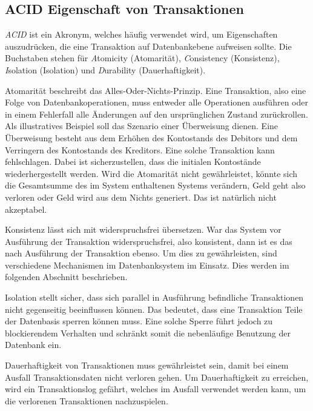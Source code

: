 \subsection{ACID Eigenschaft von Transaktionen}
\textit{ACID} ist ein Akronym, welches häufig verwendet wird, um Eigenschaften auszudrücken, die eine Transaktion auf Datenbankebene aufweisen sollte. Die Buchstaben stehen für \textit{A}tomicity (Atomarität), \textit{C}onsistency (Konsistenz), \textit{I}solation (Isolation) und \textit{D}urability (Dauerhaftigkeit). 

\par Atomarität beschreibt das Alles-Oder-Nichts-Prinzip. Eine Transaktion, also eine Folge von Datenbankoperationen, muss entweder alle Operationen ausführen oder in einem Fehlerfall alle Änderungen auf den ursprünglichen Zustand zurückrollen. Als illustratives Beispiel soll das Szenario einer Überweisung dienen. Eine Überweisung besteht aus dem Erhöhen des Kontostands des Debitors und dem Verringern des Kontostands des Kreditors. Eine solche Transaktion kann fehlschlagen. Dabei ist sicherzustellen, dass die initialen Kontostände wiederhergestellt werden. Wird die Atomarität nicht gewährleistet, könnte sich die Gesamtsumme des im System enthaltenen Systems verändern, Geld geht also verloren oder Geld wird aus dem Nichts generiert. Das ist natürlich nicht akzeptabel. 

\par Konsistenz lässt sich mit widerspruchsfrei übersetzen. War das System vor Ausführung der Transaktion widerspruchsfrei, also konsistent, dann ist es das nach Ausführung der Transaktion ebenso. Um dies zu gewährleisten, sind verschiedene Mechanismen im Datenbanksystem im Einsatz. Dies werden im folgenden Abschnitt beschrieben.

\par Isolation stellt sicher, dass sich parallel in Ausführung befindliche Transaktionen nicht gegenseitig beeinflussen können. Das bedeutet, dass eine Transaktion Teile der Datenbasis sperren können muss. Eine solche Sperre führt jedoch zu blockierendem Verhalten und schränkt somit die nebenläufige Benutzung der Datenbank ein. 

\par Dauerhaftigkeit von Transaktionen muss gewährleistet sein, damit bei einem Ausfall Transaktionsdaten nicht verloren gehen. Um Dauerhaftigkeit zu erreichen, wird ein Transaktionslog gefährt, welches im Ausfall verwendet werden kann, um die verlorenen Transaktionen nachzuspielen. 

